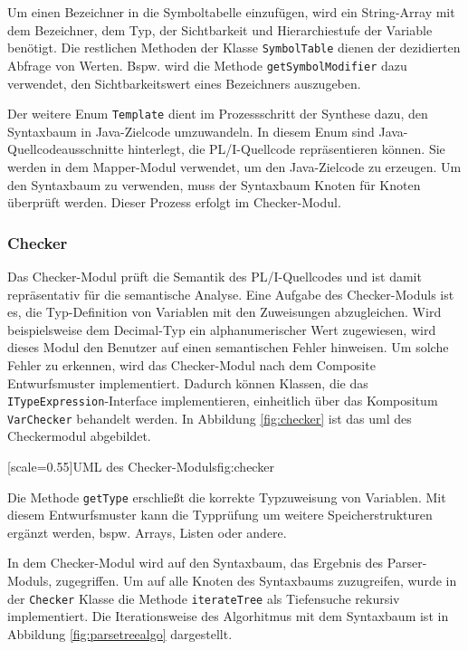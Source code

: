 Um einen Bezeichner in die Symboltabelle einzufügen, wird ein String-Array mit dem Bezeichner, dem Typ, der Sichtbarkeit und Hierarchiestufe der Variable benötigt. Die restlichen Methoden der Klasse \verb+SymbolTable+ dienen der dezidierten Abfrage von Werten. Bspw. wird die Methode \verb+getSymbolModifier+ dazu verwendet, den Sichtbarkeitswert eines Bezeichners auszugeben.

Der weitere Enum \verb+Template+ dient im Prozessschritt der Synthese dazu, den Syntaxbaum in Java-Zielcode umzuwandeln.
In diesem Enum sind Java-Quellcodeausschnitte hinterlegt, die PL/I-Quellcode repräsentieren können. Sie werden in dem Mapper-Modul verwendet, um den Java-Zielcode zu erzeugen.
Um den Syntaxbaum zu verwenden, muss der Syntaxbaum Knoten für Knoten überprüft werden. Dieser Prozess erfolgt im Checker-Modul.
 
\subsubsection{Checker}
Das Checker-Modul prüft die Semantik des PL/I-Quellcodes und ist damit repräsentativ für die semantische Analyse. 
Eine Aufgabe des Checker-Moduls ist es, die Typ-Definition von Variablen mit den Zuweisungen abzugleichen.
Wird beispielsweise dem Decimal-Typ ein alphanumerischer Wert zugewiesen, wird dieses Modul den Benutzer auf einen semantischen Fehler hinweisen. Um solche Fehler zu erkennen, wird das Checker-Modul nach dem Composite Entwurfsmuster implementiert. Dadurch können Klassen, die das \verb+ITypeExpression+-Interface implementieren, einheitlich über das Kompositum \verb+VarChecker+ behandelt werden.
In Abbildung \ref{fig:checker} ist das \ac{uml} des Checkermodul abgebildet.

[scale=0.55]{UML des Checker-Moduls}{fig:checker}

Die Methode \verb+getType+ erschließt die korrekte Typzuweisung von Variablen. Mit diesem Entwurfsmuster kann die Typprüfung um weitere Speicherstrukturen ergänzt werden, bspw. Arrays, Listen oder andere.

In dem Checker-Modul wird auf den Syntaxbaum, das Ergebnis des Parser-Moduls, zugegriffen.
Um auf alle Knoten des Syntaxbaums zuzugreifen, wurde in der \verb+Checker+ Klasse die Methode \verb+iterateTree+ als Tiefensuche rekursiv implementiert.
Die Iterationsweise des Algorhitmus mit dem Syntaxbaum ist in Abbildung \ref{fig:parsetreealgo} dargestellt.

